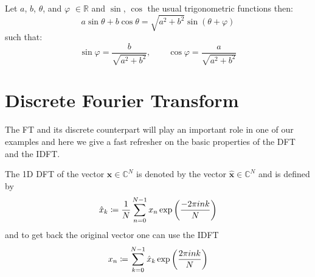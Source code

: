 	\begin{Lem}
		Let $a$, $b$, $\theta$, and $\varphi$ $\in \mathbb{R}$ and $\sin$, $\cos$ 
        the usual trigonometric functions then:
		\begin{equation}
			a\sin \theta+b\cos \theta  = \sqrt{a^2+b^2}\sin(\theta + \varphi)
		\end{equation}
		such that:
		\begin{equation}
			\sin\varphi=\frac{b}{\sqrt{a^2+b^2}}, \qquad \cos\varphi = \frac{a}{\sqrt{a^2+b^2}}
		\end{equation}
		\end{Lem}


\section{Discrete Fourier Transform}
The \ac{FT} and its discrete counterpart will play an important role in one of our examples and here we give a fast refresher on the basic properties of the \ac{DFT} and the \ac{IDFT}.

\begin{Def}[1D \ac{DFT}]\label{def:1ddft}
    The 1D \ac{DFT}  of the vector $\boldsymbol{x} \in \mathbb{C}^{N}$ is denoted by the vector $\hat {\boldsymbol{x}} \in \mathbb{C}^{N}$ and is defined by
    \begin{equation}\label{eq:1ddft}
        {\hat x}_k \coloneqq \frac{1}{N}\sum_{n=0}^{N-1} x_n\exp\left({\frac{-2\pi ink}{N}}\right)\index{\ac{FT}!$1$-$d$ \ac{DFT}}
    \end{equation}
    and to get back the original vector one can use the \ac{IDFT}
    \begin{equation}\label{eq:1didft}
        x_n \coloneqq \sum_{k=0}^{N-1}\hat{x}_{k}\exp\left({\frac{2\pi ink}{N}}\right)\index{\ac{FT}!$1$-$d$ \ac{IDFT}}
    \end{equation}    
\end{Def}

